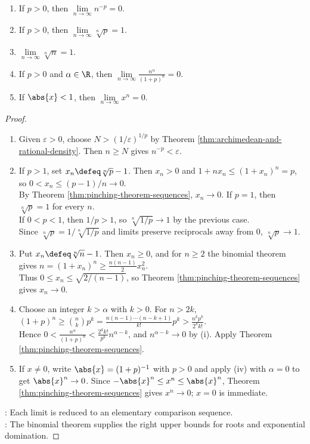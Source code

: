 \begin{theorem} \label{thm:special-sequence-limits} 
\begin{enumerate}[label=(\roman*)]
\setlength{\itemsep}{0pt}
\item If $p>0$, then $\lim\limits_{n\to\infty}n^{-p}=0$.
\item If $p>0$, then $\lim\limits_{n\to\infty}\sqrt[n]{p}=1$.
\item $\lim\limits_{n\to\infty}\sqrt[n]{n}=1$.
\item If $p>0$ and $\alpha\in\R$, then $\lim\limits_{n\to\infty}\frac{n^\alpha}{(1+p)^n}=0$.
\item If $\abs{x}<1$, then $\lim\limits_{n\to\infty}x^n=0$.
\end{enumerate}
\begin{proof}
\begin{enumerate}[label=(\roman*)]
\setlength{\itemsep}{0pt}
\item Given $\varepsilon>0$, choose $N>(1/\varepsilon)^{1/p}$ by Theorem \ref{thm:archimedean-and-rational-density}. Then $n\geq N$ gives $n^{-p}<\varepsilon$.
\item If $p>1$, set $x_n\defeq\sqrt[n]{p}-1$. Then $x_n>0$ and $1+nx_n\leq(1+x_n)^n=p$, so $0<x_n\leq(p-1)/n\to0$.\\
By Theorem \ref{thm:pinching-theorem-sequences}, $x_n\to0$. If $p=1$, then $\sqrt[n]{p}=1$ for every $n$.\\
If $0<p<1$, then $1/p>1$, so $\sqrt[n]{1/p}\to1$ by the previous case.\\
Since $\sqrt[n]{p}=1/\sqrt[n]{1/p}$ and limits preserve reciprocals away from $0$, $\sqrt[n]{p}\to1$.
\item Put $x_n\defeq\sqrt[n]{n}-1$. Then $x_n\geq0$, and for $n\geq2$ the binomial theorem gives $n=(1+x_n)^n\geq \frac{n(n-1)}{2}x_n^2$.\\
Thus $0\leq x_n\leq\sqrt{2/(n-1)}$, so Theorem \ref{thm:pinching-theorem-sequences} gives $x_n\to0$.
\item Choose an integer $k>\alpha$ with $k>0$. For $n>2k$, $(1+p)^n\geq \binom{n}{k}p^k=\frac{n(n-1)\cdots(n-k+1)}{k!}p^k>\frac{n^k p^k}{2^k k!}$.\\
Hence $0<\frac{n^\alpha}{(1+p)^n}<\frac{2^kk!}{p^k}n^{\alpha-k}$, and $n^{\alpha-k}\to0$ by (i). Apply Theorem \ref{thm:pinching-theorem-sequences}.
\item If $x\neq0$, write $\abs{x}=(1+p)^{-1}$ with $p>0$ and apply (iv) with $\alpha=0$ to get $\abs{x}^n\to0$. Since $-\abs{x}^n\leq x^n\leq\abs{x}^n$, Theorem \ref{thm:pinching-theorem-sequences} gives $x^n\to0$; $x=0$ is immediate.
\end{enumerate}
: Each limit is reduced to an elementary comparison sequence.\\
: The binomial theorem supplies the right upper bounds for roots and exponential domination.
\end{proof}
\end{theorem}

